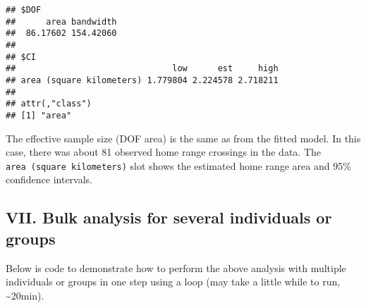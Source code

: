 \documentclass[
]{article}
\begin{document}
\begin{verbatim}
## $DOF
##      area bandwidth 
##  86.17602 154.42060 
## 
## $CI
##                               low      est     high
## area (square kilometers) 1.779804 2.224578 2.718211
## 
## attr(,"class")
## [1] "area"
\end{verbatim}

The effective sample size (DOF area) is the same as from the fitted
model. In this case, there was about 81 observed home range crossings in
the data. The \texttt{area\ (square\ kilometers)} slot shows the
estimated home range area and 95\% confidence intervals.

\subsection{VII. Bulk analysis for several individuals or
groups}\label{vii.-bulk-analysis-for-several-individuals-or-groups}

Below is code to demonstrate how to perform the above analysis with
multiple individuals or groups in one step using a loop (may take a
little while to run, \textasciitilde20min).
\end{document}
